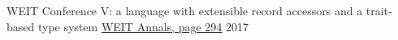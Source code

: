 \begin{cventries}
  \cventry
    {WEIT Conference}
    {V: a language with extensible record accessors and a trait-based type system}
    {\href{http://weit2017.inf.ufsm.br/wp-content/uploads/2017/10/Versao_final.pdf}{WEIT Annals, page 294}}
    {2017}
    {
    }
\end{cventries}
